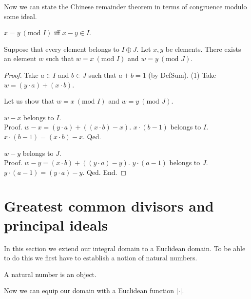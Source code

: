 \documentclass{article}
\renewcommand{\mod}{\text{mod }}
\begin{document}
  Now we can state the Chinese remainder theorem in terms of congruence modulo some ideal.

  \begin{forthel}
    \begin{definition}[DefMod]
      $x = y ~(\mod I)$ iff $x - y \in I$.
    \end{definition}

    \begin{theorem}[ChineseRemainder]
      Suppose that every element belongs to $I \oplus J$. Let $x, y$ be elements. There exists an element $w$ such that $w = x ~(\mod I)$ and $w = y ~(\mod J)$.
    \end{theorem}
    \begin{proof}
      Take $a \in I$ and $b \in J$ such that $a + b = 1$ (by DefSum).
      (1) Take $w = (y \cdot a) + (x \cdot b)$.

      Let us show that $w = x ~(\mod I)$ and $w = y ~(\mod J)$.

        $w - x$ belongs to $I$. \\
        Proof.
          $w - x = (y \cdot a) + ((x \cdot b) - x)$. $x \cdot (b - 1)$ belongs to $I$. $x \cdot (b - 1) = (x \cdot b) - x$.
        Qed.

        $w - y$ belongs to $J$. \\
        Proof.
          $w - y = (x \cdot b) + ((y \cdot a) - y)$. $y \cdot (a - 1)$ belongs to $J$. $y \cdot (a - 1) = (y \cdot a) - y$.
        Qed.
      End.
    \end{proof}
  \end{forthel}


  \section{Greatest common divisors and principal ideals}

  In this section we extend our integral domain to a Euclidean domain. To be able to do this we first have to establish a notion of natural numbers.

  \begin{forthel}

    \begin{signature}[NatSort]
      A natural number is an object.
    \end{signature}

  \end{forthel}

  Now we can equip our domain with a Euclidean function $|\cdot|$.
\end{document}
